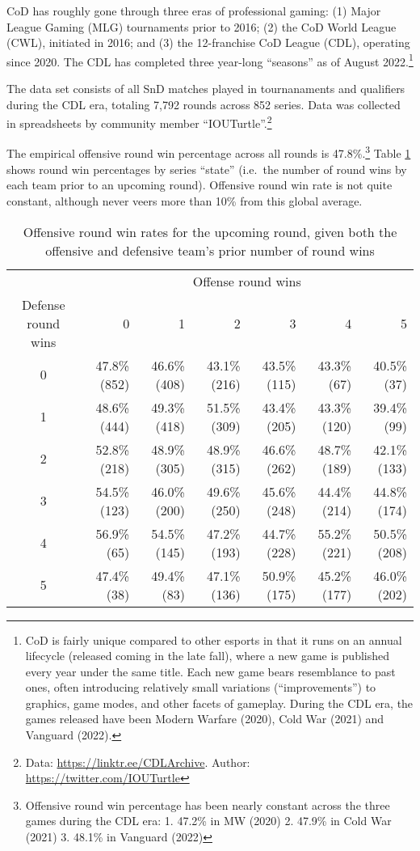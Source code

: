 \documentclass{article}
\begin{document}
CoD has roughly gone through three eras of professional gaming: (1)
Major League Gaming (MLG) tournaments prior to 2016; (2) the CoD World
League (CWL), initiated in 2016; and (3) the 12-franchise CoD League
(CDL), operating since 2020. The CDL has completed three year-long
``seasons'' as of August 2022.\footnote{CoD is fairly unique compared to
  other esports in that it runs on an annual lifecycle (released coming
  in the late fall), where a new game is published every year under the
  same title. Each new game bears resemblance to past ones, often
  introducing relatively small variations (``improvements'') to
  graphics, game modes, and other facets of gameplay. During the CDL
  era, the games released have been Modern Warfare (2020), Cold War
  (2021) and Vanguard (2022).}

The data set consists of all SnD matches played in tournanaments and
qualifiers during the CDL era, totaling 7,792 rounds across 852 series.
Data was collected in spreadsheets by community member
``IOUTurtle''.\footnote{Data: \url{https://linktr.ee/CDLArchive}.
  Author: \url{https://twitter.com/IOUTurtle}}

The empirical offensive round win percentage across all rounds is
47.8\%.\footnote{Offensive round win percentage has been nearly constant
  across the three games during the CDL era: 1. 47.2\% in MW (2020) 2.
  47.9\% in Cold War (2021) 3. 48.1\% in Vanguard (2022)} Table
\ref{tbl:cod-o-win-prop-by-series-state} shows round win percentages by
series ``state'' (i.e.~the number of round wins by each team prior to an
upcoming round). Offensive round win rate is not quite constant,
although never veers more than 10\% from this global average.

\begin{longtable}{crrrrrr}
\caption{Offensive round win rates for the upcoming round, given both the offensive and defensive team's prior number of round wins}\label{tbl:cod-o-win-prop-by-series-state} \\
\toprule
& \multicolumn{6}{c}{Offense round wins} \\ 
\cmidrule(lr){2-7}
Defense round wins & 0 & 1 & 2 & 3 & 4 & 5 \\ 
\midrule
0 & 47.8\%
(852) & 46.6\%
(408) & 43.1\%
(216) & 43.5\%
(115) & 43.3\%
(67) & 40.5\%
(37) \\ 
1 & 48.6\%
(444) & 49.3\%
(418) & 51.5\%
(309) & 43.4\%
(205) & 43.3\%
(120) & 39.4\%
(99) \\ 
2 & 52.8\%
(218) & 48.9\%
(305) & 48.9\%
(315) & 46.6\%
(262) & 48.7\%
(189) & 42.1\%
(133) \\ 
3 & 54.5\%
(123) & 46.0\%
(200) & 49.6\%
(250) & 45.6\%
(248) & 44.4\%
(214) & 44.8\%
(174) \\ 
4 & 56.9\%
(65) & 54.5\%
(145) & 47.2\%
(193) & 44.7\%
(228) & 55.2\%
(221) & 50.5\%
(208) \\ 
5 & 47.4\%
(38) & 49.4\%
(83) & 47.1\%
(136) & 50.9\%
(175) & 45.2\%
(177) & 46.0\%
(202) \\ 
\bottomrule
\end{longtable}
\end{document}
